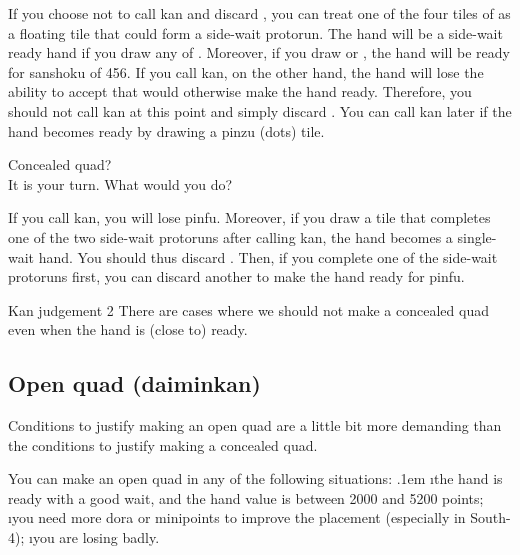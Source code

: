 \bigskip
If you choose not to call {\jap kan} and discard {\LARGE{}}, you can treat one of the four tiles of {\LARGE{}} as a floating tile that could form a side-wait protorun. The hand will be a side-wait ready hand if you draw any of {\LARGE{}}. Moreover, if you draw {\LARGE{}} or {\LARGE{}}, the hand will be ready for {\jap sanshoku} of 456. 
If you call {\jap kan}, on the other hand, the hand will lose the ability to accept {\LARGE{}} that would otherwise make the hand ready.
Therefore, you should not call {\jap kan} at this point and simply discard {\LARGE{}}. You can call {\jap kan} later if the hand becomes ready by drawing a {\jap pinzu} (dots) tile.

\bigskip
\begin{itembox}[r]{Concealed quad?}
\bp
{}\\
\ep
\vspace{-10pt}It is your turn. What would you do?
\end{itembox}
\noindent
If you call {\jap kan}, you will lose {\jap pinfu}. Moreover, if you draw a tile that completes one of the two side-wait protoruns after calling {\jap kan}, the hand becomes a single-wait hand. You should thus discard {\LARGE{}}. Then, if you complete one of the side-wait protoruns first, you can discard another {\LARGE{}} to make the hand ready for {\jap pinfu}. 

\bigskip
\begin{itembox}[c]{{\jap Kan} judgement 2}
There are cases where we should not make a concealed quad even when the hand is (close to) ready.
\end{itembox}


\subsection{Open quad ({\jap daiminkan})}
Conditions to justify making an open quad are a little bit more demanding than the conditions to justify making a concealed quad. 

\bigskip
You can make an open quad in any of the following situations:
\bi \itemsep.1em
\i the hand is ready with a good wait, and the hand value is between 2000 and 5200 points;
\i you need more {\jap dora} or minipoints to improve the placement (especially in South-4);
\i you are losing badly.
\ei

